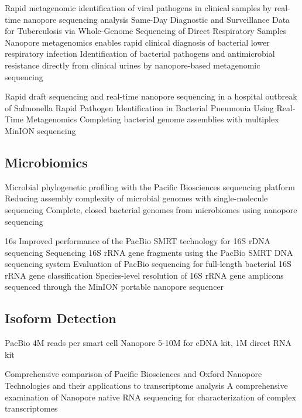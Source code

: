 Rapid metagenomic identification of viral pathogens in clinical samples by real-time nanopore sequencing analysis \cite{Greninger2015}
Same-Day Diagnostic and Surveillance Data for Tuberculosis via Whole-Genome Sequencing of Direct Respiratory Samples \cite{Votintseva2017}
Nanopore metagenomics enables rapid clinical diagnosis of bacterial lower respiratory infection \cite{Charalampous2019}
Identification of bacterial pathogens and antimicrobial resistance directly from clinical urines by nanopore-based metagenomic sequencing \cite{Schmidt2017}

Rapid draft sequencing and real-time nanopore sequencing in a hospital outbreak of Salmonella \cite{Quick2015}
Rapid Pathogen Identification in Bacterial Pneumonia Using Real-Time Metagenomics \cite{Pendleton2017}
Completing bacterial genome assemblies with multiplex MinION sequencing \cite{Wick2017}




\subsection{Microbiomics}
\label{subsec:state_of_art:metagenomics}

Microbial phylogenetic profiling with the Pacific Biosciences sequencing platform \cite{Fichot2013}
Reducing assembly complexity of microbial genomes with single-molecule sequencing \cite{Koren2013}
Complete, closed bacterial genomes from microbiomes using nanopore sequencing \cite{Moss2020}

16s
Improved performance of the PacBio SMRT technology for 16S rDNA sequencing \cite{Mosher2014}
Sequencing 16S rRNA gene fragments using the PacBio SMRT DNA sequencing system \cite{Schloss2016}
Evaluation of PacBio sequencing for full-length bacterial 16S rRNA gene classification \cite{Wagner2016}
Species-level resolution of 16S rRNA gene amplicons sequenced through the MinION portable nanopore sequencer \cite{Benitez-Paez2016}




\subsection{Isoform Detection}
\label{subsec:state_of_art:isoform}

PacBio 4M reads per smart cell
Nanopore 5-10M for cDNA kit, 1M direct RNA kit

Comprehensive comparison of Pacific Biosciences and Oxford Nanopore Technologies and their applications to transcriptome analysis \cite{Weirather2017}
A comprehensive examination of Nanopore native RNA sequencing for characterization of complex transcriptomes \cite{Soneson2019}

